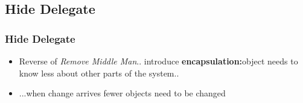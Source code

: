 \documentclass{beamer}
\begin{document}
\subsection{Hide Delegate}
\begin{frame}
  \frametitle{Hide Delegate}
  \begin{itemize}
	\item<+-> Reverse of \textit{Remove Middle Man}.. introduce \textbf{encapsulation:}object needs to know less about other parts of the system..
	\item<+-> ...when change arrives fewer objects need to be changed
   \end{itemize}
\end{frame}
\end{document}
